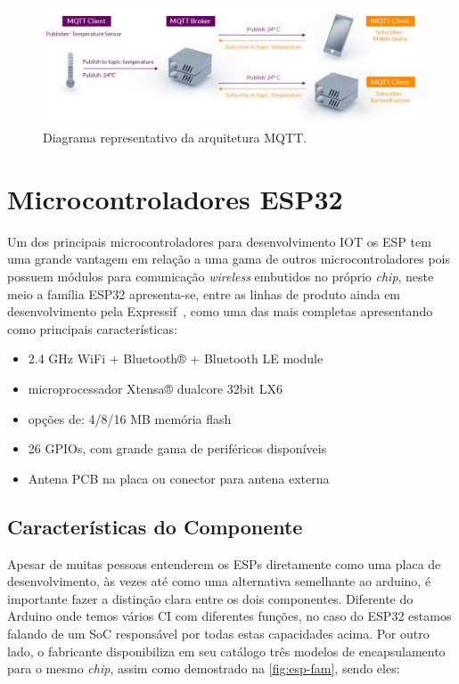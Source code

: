 \begin{figure}[htb]
    \begin{center}
	    \includegraphics[scale=0.3]{figs/mqtt-publish-subscribe.png}
	\end{center}
	\caption{\label{fig:mqtt_sys} Diagrama representativo da arquitetura \ac{MQTT}.} 
\end{figure}

\section{Microcontroladores ESP32}

Um dos principais microcontroladores para desenvolvimento \ac{IOT} os ESP tem uma grande vantagem em relação 
a uma gama de outros microcontroladores pois possuem módulos para comunicação \textit{wireless} embutidos no próprio
\textit{chip}, neste meio a família ESP32 apresenta-se, entre as linhas de produto ainda em desenvolvimento pela 
Expressif\textregistered~, como uma das mais completas apresentando como principais características:

\begin{itemize}
\item 2.4 GHz Wi­Fi + Bluetooth® + Bluetooth LE module
\item microprocessador Xtensa® dual­core 32­bit LX6
\item opções de: 4/8/16 MB memória flash
\item 26 GPIOs, com grande gama de periféricos disponíveis
\item Antena PCB na placa ou conector para antena externa
\end{itemize}

\subsection{Características do Componente}

Apesar de muitas pessoas entenderem os ESPs diretamente como uma placa de desenvolvimento, às vezes até como uma 
alternativa semelhante ao arduino, é importante fazer a distinção clara entre os dois componentes. Diferente 
do Arduino onde temos vários \ac{CI} com diferentes funções, no caso do ESP32 estamos falando de um \ac{SoC} responsável
por todas estas capacidades acima. Por outro lado, o fabricante disponibiliza em seu catálogo três modelos de encapsulamento
para o mesmo \textit{chip}, assim como demostrado na \autoref{fig:esp-fam}, sendo eles: 

